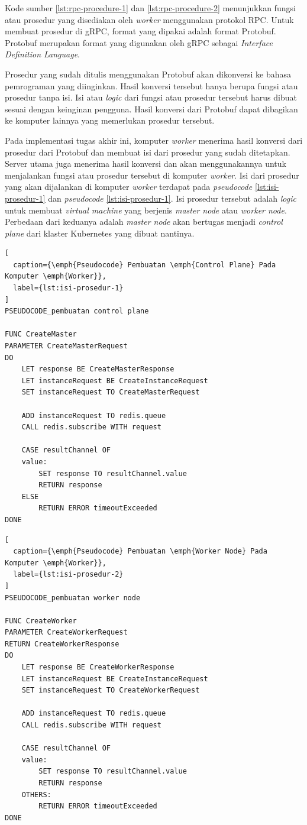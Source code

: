 Kode sumber \ref{lst:rpc-procedure-1} dan \ref{lst:rpc-procedure-2} menunjukkan fungsi atau prosedur
yang disediakan oleh \emph{worker} menggunakan protokol RPC. Untuk membuat prosedur
di gRPC, format yang dipakai adalah format Protobuf. Protobuf merupakan format
yang digunakan oleh gRPC sebagai \emph{Interface Definition Language}.

Prosedur yang sudah ditulis menggunakan Protobuf akan dikonversi
ke bahasa pemrograman yang diinginkan. Hasil konversi tersebut hanya
berupa fungsi atau prosedur tanpa isi. Isi atau \emph{logic} dari fungsi atau prosedur
tersebut harus dibuat sesuai dengan keinginan pengguna. Hasil konversi dari Protobuf
dapat dibagikan ke komputer lainnya yang memerlukan prosedur tersebut. 

Pada implementasi tugas akhir ini, komputer \emph{worker} menerima
hasil konversi dari prosedur dari Protobuf dan membuat isi dari
prosedur yang sudah ditetapkan. Server utama juga menerima hasil konversi
dan akan menggunakannya untuk menjalankan fungsi atau prosedur tersebut di komputer
\emph{worker}. Isi dari prosedur yang akan dijalankan di komputer \emph{worker} terdapat
pada \emph{pseudocode} \ref{lst:isi-prosedur-1} dan \emph{pseudocode} \ref{lst:isi-prosedur-1}.
Isi prosedur tersebut adalah \emph{logic} untuk membuat \emph{virtual machine} yang berjenis
\emph{master node} atau \emph{worker node}. Perbedaan dari keduanya adalah \emph{master node}
akan bertugas menjadi \emph{control plane} dari klaster Kubernetes yang dibuat nantinya.

\clearpage

\begin{lstlisting}[
  caption={\emph{Pseudocode} Pembuatan \emph{Control Plane} Pada Komputer \emph{Worker}},
  label={lst:isi-prosedur-1}
]
PSEUDOCODE_pembuatan control plane

FUNC CreateMaster
PARAMETER CreateMasterRequest
DO
    LET response BE CreateMasterResponse
    LET instanceRequest BE CreateInstanceRequest
    SET instanceRequest TO CreateMasterRequest

    ADD instanceRequest TO redis.queue
    CALL redis.subscribe WITH request
    
    CASE resultChannel OF
    value:
        SET response TO resultChannel.value
        RETURN response
    ELSE
        RETURN ERROR timeoutExceeded
DONE
\end{lstlisting}

\begin{lstlisting}[
  caption={\emph{Pseudocode} Pembuatan \emph{Worker Node} Pada Komputer \emph{Worker}},
  label={lst:isi-prosedur-2}
]
PSEUDOCODE_pembuatan worker node

FUNC CreateWorker
PARAMETER CreateWorkerRequest
RETURN CreateWorkerResponse 
DO
    LET response BE CreateWorkerResponse
    LET instanceRequest BE CreateInstanceRequest
    SET instanceRequest TO CreateWorkerRequest

    ADD instanceRequest TO redis.queue
    CALL redis.subscribe WITH request
    
    CASE resultChannel OF
    value:
        SET response TO resultChannel.value
        RETURN response
    OTHERS:
        RETURN ERROR timeoutExceeded
DONE
\end{lstlisting}

